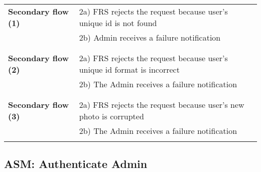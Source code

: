 \documentclass[a4paper,11pt]{article}
\begin{document}
\begin{tabular}{|p{4cm}|p{10cm}|}
  \textbf{Secondary flow (1)} &  
  2a) FRS rejects the request because user's unique id is not found \\& 
  2b) Admin receives a failure notification \\&  
   
  \\ \hline \rowcolor{Gray} & \\ \hline  
   
  \textbf{Secondary flow (2)} &  
  2a) FRS rejects the request because user's unique id format is incorrect \\& 
  2b) The Admin receives a failure notification \\& 
   
   
  \\ \hline \rowcolor{Gray} & \\ \hline  
   
  \textbf{Secondary flow (3)} &  
  2a) FRS rejects the request because user's new photo is corrupted\\& 
  2b) The Admin receives a failure notification \\& 
  \\ \hline   
\end{tabular} 

\subsection{ASM: Authenticate Admin}
 
\end{document}
